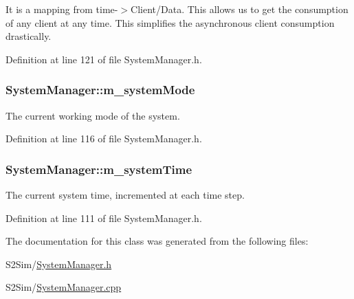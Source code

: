 It is a mapping from time-\/$>$Client/\-Data. This allows us to get the consumption of any client at any time. This simplifies the asynchronous client consumption drastically. 

Definition at line 121 of file System\-Manager.\-h.

\hypertarget{class_system_manager_a25bf998fe8f48168e2ad4c3dfd3bad91}{
\subsubsection[{m\-\_\-system\-Mode}]{ System\-Manager\-::m\-\_\-system\-Mode\hspace{0.3cm}{\ttfamily [private]}}}\label{class_system_manager_a25bf998fe8f48168e2ad4c3dfd3bad91}


The current working mode of the system. 



Definition at line 116 of file System\-Manager.\-h.

\hypertarget{class_system_manager_af5a7fec3622669af269cbcf7b1b2af22}{
\subsubsection[{m\-\_\-system\-Time}]{ System\-Manager\-::m\-\_\-system\-Time\hspace{0.3cm}{\ttfamily [private]}}}\label{class_system_manager_af5a7fec3622669af269cbcf7b1b2af22}


The current system time, incremented at each time step. 



Definition at line 111 of file System\-Manager.\-h.



The documentation for this class was generated from the following files\-:\begin{DoxyCompactItemize}
\item 
S2\-Sim/\hyperlink{_system_manager_8h}{System\-Manager.\-h}\item 
S2\-Sim/\hyperlink{_system_manager_8cpp}{System\-Manager.\-cpp}\end{DoxyCompactItemize}
